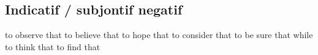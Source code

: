 \subsection*{Indicatif / subjontif negatif}
   {to observe that}
   {to believe that}
   {to hope that}
   {to consider that}
   {to be sure that}
   {while}
   {to think that}
   {to find that}

